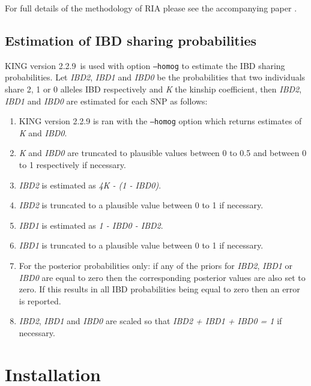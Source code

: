 \documentclass[a4paper,12pt]{article}
\newcommand{\code}[1]{{\footnotesize{{\tt #1}}}}
\begin{document}
For full details of the methodology of RIA please see the accompanying paper \citet{nat:15}. 


\subsection{Estimation of IBD sharing probabilities}
\label{ibd-calc}

KING version 2.2.9~is used with option \code{--homog} to estimate the IBD sharing probabilities. Let {\it IBD2}, {\it IBD1} and {\it IBD0} be the probabilities that two individuals share 2, 1 or 0 alleles IBD respectively and {\it K} the kinship coefficient, then {\it IBD2}, {\it IBD1} and {\it IBD0} are estimated for each SNP as follows: 
\begin{enumerate}

\item KING version 2.2.9 is ran with the \code{--homog} option which returns estimates of {\it K} and {\it IBD0}. 
\item {\it K} and {\it IBD0} are truncated to plausible values between 0 to 0.5 and between 0 to 1 respectively if necessary. 
\item {\it IBD2} is estimated as {\it 4K - (1 - IBD0)}. 
\item {\it IBD2} is truncated to a plausible value between 0 to 1 if necessary. 
\item {\it IBD1} is estimated as {\it 1 - IBD0 - IBD2}. 
\item {\it IBD1} is truncated to a plausible value between 0 to 1 if necessary. 
\item For the posterior probabilities only: if any of the priors for {\it IBD2}, {\it IBD1} or {\it IBD0} are equal to zero then the corresponding posterior values are also set to zero. If this results in all IBD probabilities being equal to zero then an error is reported. 
\item {\it IBD2}, {\it IBD1} and {\it IBD0} are scaled so that {\it IBD2 + IBD1 + IBD0 = 1} if necessary.\end{enumerate}




\section{Installation}
\label{installation}
\end{document}
